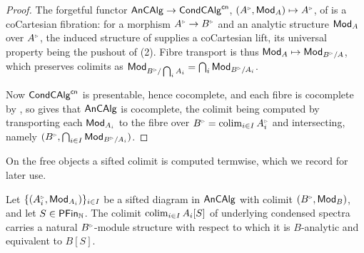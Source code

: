 \begin{proof}
    The forgetful functor $\mathsf{An}\mathsf{CAlg}\to\mathsf{Cond}\mathsf{CAlg}^{\mathsf{cn}}$, $(A^{\tri},\Mod_{A})\mapsto A^{\tri}$, of  is a coCartesian fibration: for a morphism $A^{\tri}\to B^{\tri}$ and an analytic structure $\mathsf{Mod}_{A}$ over $A^{\tri}$, the induced structure of  supplies a coCartesian lift, its universal property being the pushout of  (2). Fibre transport is thus $\Mod_{A}\mapsto\Mod_{B^{\tri}/A}$, which preserves colimits as $\Mod_{B^{\tri}/\bigcap_{i}A_{i}}=\bigcap_{i}\Mod_{B^{\tri}/A_{i}}$. 
    
    Now $\mathsf{Cond}\mathsf{CAlg}^{\mathsf{cn}}$ is presentable, hence cocomplete, and each fibre is cocomplete by , so \cite[Lem. 10.7]{LaxFree} gives that $\mathsf{An}\mathsf{CAlg}$ is cocomplete, the colimit being computed by transporting each $\mathsf{Mod}_{A_{i}}$ to the fibre over $B^{\tri}=\colim_{i\in I}A_{i}^{\tri}$ and intersecting, namely $(B^{\tri},\bigcap_{i\in I}\Mod_{B^{\tri}/A_{i}})$. 
\end{proof}
On the free objects a sifted colimit is computed termwise, which we record for later use.
\begin{lemma}\label{lem: sifted colimits in AnCAlg}
    Let $\{(A_{i}^{\tri},\Mod_{A_{i}})\}_{i\in I}$ be a sifted diagram in $\mathsf{An}\mathsf{CAlg}$ with colimit $(B^{\tri},\Mod_{B})$, and let $S\in\mathsf{PFin}_{\mathbb{N}}$. The colimit $\operatorname*{colim}_{i\in I}A_{i}[S]$ of underlying condensed spectra carries a natural $B^{\tri}$-module structure with respect to which it is $B$-analytic and equivalent to $B[S]$.
\end{lemma}
